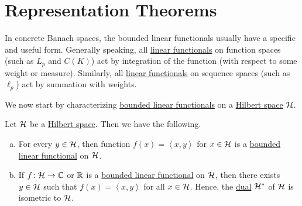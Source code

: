 \section{Representation Theorems}
In concrete Banach spaces, the bounded linear functionals usually have a specific and useful form. Generally speaking, all \hyperref[def:linear-functional]{linear functionals} on function spaces (such as \(L_p\) and \(C(K)\)) act by integration of the function (with respect to some weight or measure). Similarly, all \hyperref[def:linear-functional]{linear functionals} on sequence spaces (such as \(\ell _p\)) act by summation with weights.

We now start by characterizing \hyperref[def:bounded-linear-functional]{bounded linear functionals} on a \hyperref[def:Hilbert-space]{Hilbert space} \(\mathcal{\MakeUppercase{h}} \).
\begin{theorem}\label{thm:Riesz-representation}
	Let \(\mathcal{\MakeUppercase{h}} \) be a \hyperref[def:Hilbert-space]{Hilbert space}. Then we have the following.
	\begin{enumerate}[(a)]
		\item For every \(y\in \mathcal{\MakeUppercase{h}} \), then function \(f(x) = \left\langle x, y \right\rangle \) for \(x\in \mathcal{\MakeUppercase{h}} \) is a \hyperref[def:bounded-linear-functional]{bounded linear functional} on \(\mathcal{\MakeUppercase{h}} \).
		\item If \(f\colon \mathcal{\MakeUppercase{h}} \to \mathbb{\MakeUppercase{c}} \) or \(\mathbb{\MakeUppercase{r}} \) is a \hyperref[def:bounded-linear-functional]{bounded linear functional} on \(\mathcal{\MakeUppercase{h}} \), then there exists \(y\in \mathcal{\MakeUppercase{h}} \) such that \(f(x) = \left\langle x,y \right\rangle \) for all \(x\in \mathcal{\MakeUppercase{h}} \). Hence, the \hyperref[def:dual-space]{dual} \(\mathcal{\MakeUppercase{h}} ^{\ast} \) of \(\mathcal{\MakeUppercase{h}} \) is isometric to \(\mathcal{\MakeUppercase{h}} \).
	\end{enumerate}
\end{theorem}
